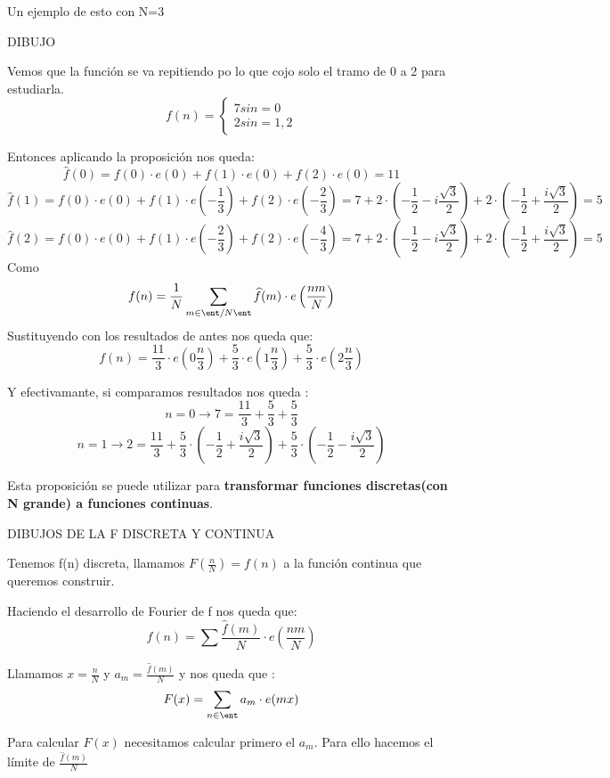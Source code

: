 \begin{example}
	Un ejemplo de esto con N=3

	DIBUJO

	Vemos que la función se va repitiendo po lo que cojo solo el tramo de 0 a 2 para estudiarla.
	$$f(n) = \begin{cases}
	7 si n= 0\\
	2 si n = 1 , 2
	\end{cases}$$

	Entonces aplicando la proposición nos queda:
	$$\widehat{f}(0) = f(0)\cdot e(0) + f(1)\cdot e(0) + f(2) \cdot e(0) =  11$$
	$$\widehat{f}(1) = f(0)\cdot e(0) + f(1)\cdot e\left(-\frac{1}{3}\right) + f(2)\cdot e\left(-\frac{2}{3}\right) = 7 + 2\cdot\left(-\frac{1}{2} -i\frac{\sqrt{3}}{2}\right) + 2\cdot \left(-\frac{1}{2} + \frac{i\sqrt{3}}{2}\right) = 5$$
	$$\widehat{f}(2) = f(0)\cdot e(0) + f(1)\cdot e\left(- \frac{2}{3}\right) + f(2) \cdot e\left(-\frac{4}{3}\right) = 7 + 2\cdot\left(-\frac{1}{2} -i\frac{\sqrt{3}}{2}\right) + 2\cdot \left(-\frac{1}{2} + \frac{i\sqrt{3}}{2}\right) = 5$$
	Como
	$$f(n) = \frac{1}{N} \sum_{m\in \ent/ N\ent} \widehat{f}(m) \cdot e\left(\frac{nm}{N}\right)$$
	Sustituyendo con los resultados de antes nos queda que:
	$$f(n) = \frac{11}{3}\cdot e\left(0 \frac{n}{3}\right) + \frac{5}{3}\cdot e\left(1 \frac{n}{3}\right) + \frac{5}{3} \cdot e\left(2 \frac{n}{3}\right)$$

	Y efectivamante, si comparamos resultados nos queda :
	$$n = 0 \rightarrow 7 = \frac{11}{3} + \frac{5}{3} + \frac{5}{3}$$
	$$n = 1 \rightarrow 2 = \frac{11}{3} + \frac{5}{3} \cdot \left(- \frac{1}{2} + \frac{i \sqrt{3}}{2}\right) + \frac{5}{3} \cdot \left(- \frac{1}{2} -\frac{i \sqrt{3}}{2}\right)$$
\end{example}

Esta proposición se puede utilizar para \textbf{transformar funciones discretas(con N grande) a funciones continuas}.

DIBUJOS DE LA F DISCRETA Y CONTINUA

Tenemos f(n) discreta, llamamos $F\left(\frac{n}{N}\right) = f(n)$ a la función continua que queremos construir.


Haciendo el desarrollo de Fourier de f nos queda que:
$$f(n) = \sum \frac{\widehat{f}(m)}{N} \cdot e\left(\frac{nm}{N}\right)$$

Llamamos $x = \frac{n}{N}$ y $a_m= \frac{\widehat{f}(m)}{N}$ y nos queda que :
$$F(x) = \sum_{n\in \ent } a_m \cdot e(mx)$$

Para calcular $F(x)$ necesitamos calcular primero el $a_m$. Para ello hacemos el límite de $\frac{\widehat{f}(m)}{N}$


